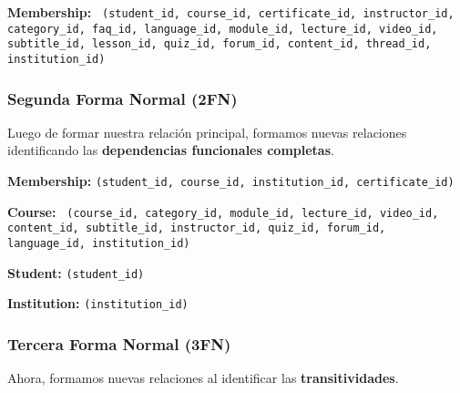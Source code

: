 \documentclass[../main.tex]{subfiles}
\begin{document}
\begin{flushleft}
  \textbf{Membership:} \texttt{%
    (student\_id, course\_id, certificate\_id, instructor\_id, category\_id,
    faq\_id, language\_id, module\_id, lecture\_id, video\_id, subtitle\_id,
    lesson\_id, quiz\_id, forum\_id, content\_id, thread\_id, institution\_id)
  }
\end{flushleft}

\subsubsection{Segunda Forma Normal (2FN)}

Luego de formar nuestra relación principal, formamos nuevas relaciones
identificando las \textbf{dependencias funcionales completas}.

\begin{flushleft}
  \textbf{Membership:} \texttt{(student\_id, course\_id, institution\_id, certificate\_id)}

  \textbf{Course:} \texttt{%
    (course\_id, category\_id, module\_id, lecture\_id, video\_id, content\_id,
    subtitle\_id, instructor\_id, quiz\_id, forum\_id, language\_id, institution\_id)
  }

  \textbf{Student:} \texttt{(student\_id)}

  \textbf{Institution:} \texttt{(institution\_id)}
\end{flushleft}

\subsubsection{Tercera Forma Normal (3FN)}

Ahora, formamos nuevas relaciones al identificar las \textbf{transitividades}.
\end{document}
